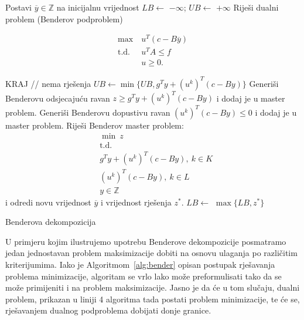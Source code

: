 \documentclass[b5paper, utf8, 11pt, colorlinks]{book}
\theoremstyle{definition}
\begin{document}
 \begin{algorithm}[H] \label{alg:bender}
 	\begin{algorithmic}[1] 
 		\STATE Postavi $\overline{y}\in\mathbb{Z}$ na inicijalnu vrijednost
 		\STATE 	$LB \gets$ $-\infty$; $UB \gets$ $+\infty$
 		\STATE Riješi dualni problem (Benderov podproblem)
 		
 		$$	\begin{aligned}
 			\max\ &u^T (c-B\overline{y})\\
 			\mbox{t.d.}\ &u^TA\leqslant f\\
 			&u\geqslant 0.
 			\end{aligned}$$
 		
 		\STATE  KRAJ // nema  rješenja  
 		\ENDIF
 		\STATE $UB \gets \min\{UB,g^Ty+(u^k)^T(c-By)\}$
 		\STATE Generiši Benderovu odsjecajuću ravan $z\geqslant g^Ty+(u^k)^T(c-By)$ i dodaj je u master problem.
 		\ENDIF
		\STATE Generiši Benderovu dopustivu ravan 	$(u^k)^T(c-By)\leqslant 0$ i dodaj je u master problem.
		\ENDIF
		\STATE Riješi Benderov master problem:
			$$\begin{aligned}
			&\min\ z\\
			& {\mbox{t.d.}}\\
			& g^Ty+(u^k)^T(c-By), \ k \in K\\
			& (u^k)^T(c-By), \ k \in L\\
			&y \in \mathbb{Z}
		\end{aligned}$$
			i odredi novu vrijednost $\overline{y}$ i vrijednost rješenja $z^*$.
		\STATE $LB \gets$ $\max\{LB,z^*\}$
 		\ENDWHILE
 	\end{algorithmic}
 	\caption{Benderova dekompozicija}\label{alg:bender}
 \end{algorithm}



U primjeru kojim ilustrujemo upotrebu Benderove dekompozicije posmatramo jedan jednostavan problem maksimizacije dobiti na osnovu ulaganja po različitim kriterijumima.
Iako je Algoritmom~\ref{alg:bender} opisan postupak rješavanja problema minimizacije, algoritam se vrlo lako može preformulisati tako da se može primijeniti i na problem maksimizacije. Jasno je da će u tom slučaju, dualni problem, prikazan u liniji 4 algoritma tada postati problem minimizacije, te će se, rješavanjem dualnog podproblema dobijati donje granice.
\end{document}
